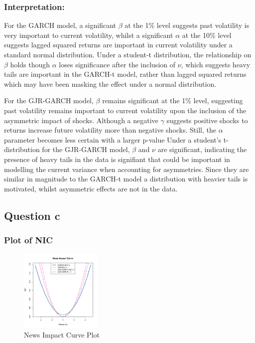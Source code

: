 \documentclass{article}
\begin{document}
\subsubsection*{Interpretation:}

For the GARCH model, a significant $\beta$ at the 1\% level suggests past volatility is very important to current volatility, whilst a significant $\alpha$ at the 10\% level suggests lagged squared returns are important in current volatility under a standard normal distribution.  
Under a student-t distribution, the relationship on $\beta$ holds though $\alpha$ loses significance after the inclusion of $\nu$, which suggests heavy tails are important in the GARCH-t model, rather than lagged squared returns which may have been masking the effect under a normal distribution. 

For the  GJR-GARCH model, $\beta$ remains significant at the 1\% level, suggesting past volatility remains important to current volatility upon the inclusion of the asymmetric impact of shocks. 
Although a negative $\gamma$ suggests positive shocks to returns increase future volatility more than negative shocks. 
Still, the $\alpha$ parameter becomes less certain with a larger p-value
Under a student's t-distribution for the GJR-GARCH model, $\beta$ and $\nu$ are significant, indicating the presence of heavy tails in the data is signifiant that could be important in modelling the current variance when accounting for asymmetries. 
Since they are similar in magnitude to the GARCH-t model a distribution with heavier tails is motivated, whilst asymmetric effects are not in the data. 

\subsection*{Question c}
\subsubsection*{Plot of NIC}
 
\begin{figure}[H]
    \centering
    \includegraphics[width=0.35\textwidth]{../../docs/figures/NIC.png}
    \caption{News Impact Curve Plot}
    \label{fig:nic}
\end{figure}
\end{document}
